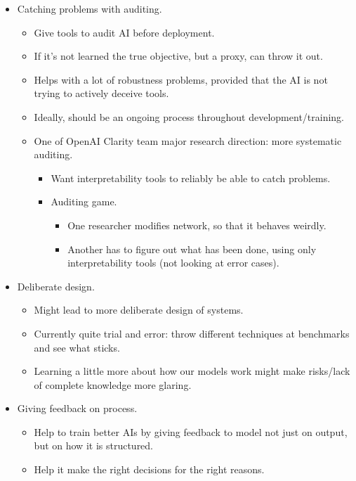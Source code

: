 \begin{itemize}
    \item Catching problems with auditing.
    \begin{itemize}
        \item Give tools to audit AI before deployment.
        \item If it's not learned the true objective, but a proxy, can throw it out.
        \item Helps with a lot of robustness problems, provided that the AI is not trying to actively deceive tools.
        \item Ideally, should be an ongoing process throughout development/training.
        \item One of OpenAI Clarity team major research direction: more systematic auditing.
        \begin{itemize}
            \item Want interpretability tools to reliably be able to catch problems.
            \item Auditing game.
            \begin{itemize}
                \item One researcher modifies network, so that it behaves weirdly.
                \item Another has to figure out what has been done, using only interpretability tools (not looking at error cases).
            \end{itemize}
        \end{itemize}
    \end{itemize}
    \item Deliberate design.
    \begin{itemize}
        \item Might lead to more deliberate design of systems.
        \item Currently quite trial and error: throw different techniques at benchmarks and see what sticks.
        \item Learning a little more about how our models work might make risks/lack of complete knowledge more glaring.
    \end{itemize}
    \item Giving feedback on process.
    \begin{itemize}
        \item Help to train better AIs by giving feedback to model not just on output, but on how it is structured.
        \item Help it make the right decisions for the right reasons.

\end{itemize}
\end{itemize}
